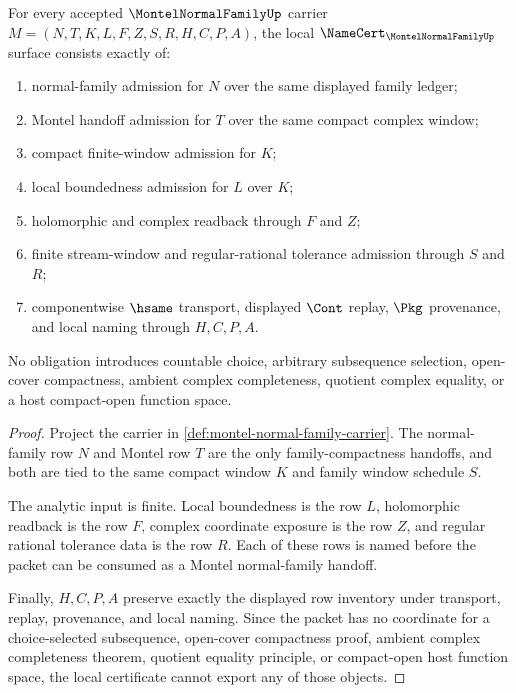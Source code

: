 \begin{theorem}
\label{thm:montel-normal-family-namecert-obligations}
For every accepted $\MontelNormalFamilyUp$ carrier $M=(N,T,K,L,F,Z,S,R,H,C,P,A)$, the local $\NameCert_{\MontelNormalFamilyUp}$ surface consists exactly of:
\begin{enumerate}
\item normal-family admission for $N$ over the same displayed family ledger;
\item Montel handoff admission for $T$ over the same compact complex window;
\item compact finite-window admission for $K$;
\item local boundedness admission for $L$ over $K$;
\item holomorphic and complex readback through $F$ and $Z$;
\item finite stream-window and regular-rational tolerance admission through $S$ and $R$;
\item componentwise $\hsame$ transport, displayed $\Cont$ replay, $\Pkg$ provenance, and local naming through $H,C,P,A$.
\end{enumerate}
No obligation introduces countable choice, arbitrary subsequence selection, open-cover compactness, ambient complex completeness, quotient complex equality, or a host compact-open function space.
\end{theorem}
\begin{proof}
Project the carrier in \autoref{def:montel-normal-family-carrier}. The normal-family row $N$ and Montel row $T$ are the only family-compactness handoffs, and both are tied to the same compact window $K$ and family window schedule $S$.

The analytic input is finite. Local boundedness is the row $L$, holomorphic readback is the row $F$, complex coordinate exposure is the row $Z$, and regular rational tolerance data is the row $R$. Each of these rows is named before the packet can be consumed as a Montel normal-family handoff.

Finally, $H,C,P,A$ preserve exactly the displayed row inventory under transport, replay, provenance, and local naming. Since the packet has no coordinate for a choice-selected subsequence, open-cover compactness proof, ambient complex completeness theorem, quotient equality principle, or compact-open host function space, the local certificate cannot export any of those objects.
\end{proof}

